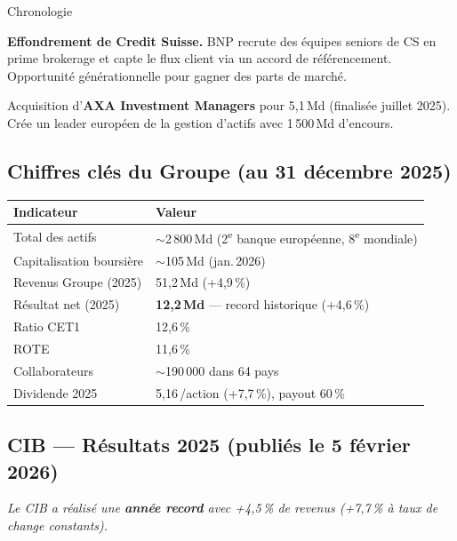 \documentclass[11pt,a4paper]{article}
\begin{document}
\begin{graybox}{Chronologie}
\begin{description}[style=nextline, leftmargin=0.8cm, nosep, itemsep=5pt]
\item[\textbf{2023}] \textbf{Effondrement de Credit Suisse.} BNP recrute des \'equipes
seniors de CS en prime brokerage et capte le flux client via un accord de r\'ef\'erencement.
Opportunit\'e g\'en\'erationnelle pour gagner des parts de march\'e.

\item[\textbf{2024--2025}] Acquisition d'\textbf{AXA Investment Managers} pour
5,1\,Md\texteuro{} (finalis\'ee juillet 2025). Cr\'ee un leader europ\'een de la gestion
d'actifs avec 1\,500\,Md\texteuro{} d'encours.

\end{description}
\end{graybox}

\subsection{Chiffres cl\'es du Groupe (au 31 d\'ecembre 2025)}

\begin{center}
\small
\begin{tabular}{@{}ll@{}}
\toprule
\textbf{Indicateur} & \textbf{Valeur} \\
\midrule
Total des actifs & $\sim$2\,800\,Md\texteuro{} (2\textsuperscript{e} banque europ\'eenne, 8\textsuperscript{e} mondiale) \\
Capitalisation boursi\`ere & $\sim$105\,Md\texteuro{} (jan.\,2026) \\
Revenus Groupe (2025) & 51,2\,Md\texteuro{} (+4,9\,\%) \\
R\'esultat net (2025) & \textbf{12,2\,Md\texteuro{}} --- record historique (+4,6\,\%) \\
Ratio CET1 & 12,6\,\% \\
ROTE & 11,6\,\% \\
Collaborateurs & $\sim$190\,000 dans 64 pays \\
Dividende 2025 & 5,16\,\texteuro{}/action (+7,7\,\%), payout 60\,\% \\
\bottomrule
\end{tabular}
\end{center}

\subsection{CIB --- R\'esultats 2025 (publi\'es le 5 f\'evrier 2026)}

\textit{Le CIB a r\'ealis\'e une \textbf{ann\'ee record} avec +4,5\,\% de revenus
(+7,7\,\% \`a taux de change constants).}
\end{document}
